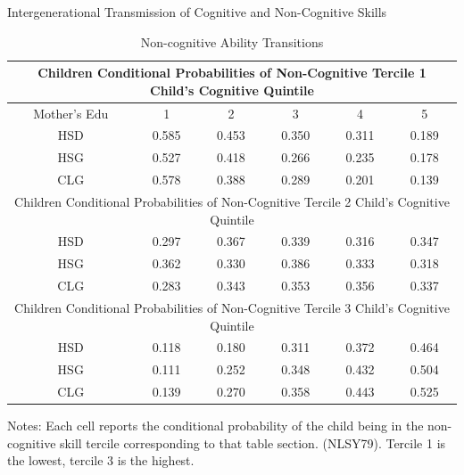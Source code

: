 \documentclass{beamer}
\begin{document}
\begin{frame}[label=Transmission1]{Intergenerational Transmission of Cognitive and Non-Cognitive Skills}
\hyperlink{Return5}{}

\begin {table}[H]
\caption {Non-cognitive Ability Transitions} \label{tab:title} 
\begin{center}
  \begin{tabular}{c | c  c  c  c  c}
      

\multicolumn{6}{c}{\tiny{Children Conditional Probabilities of Non-Cognitive Tercile 1 Child’s Cognitive Quintile}} \\

\hline
Mother’s Edu& 1& 2& 3& 4 & 5\\ \hline
HSD& 0.585 &0.453& 0.350 &0.311& 0.189\\
HSG& 0.527 &0.418 &0.266 &0.235& 0.178\\
CLG &0.578& 0.388& 0.289 &0.201& 0.139\\\hline

\multicolumn{6}{c}{\tiny{Children Conditional Probabilities of Non-Cognitive Tercile 2 Child’s Cognitive Quintile}}\\
HSD & 0.297 &0.367& 0.339 &0.316& 0.347\\
HSG & 0.362 &0.330 &0.386 &0.333 &0.318\\
CLG &0.283& 0.343 &0.353& 0.356& 0.337\\\hline

\multicolumn{6}{c}{\tiny{Children Conditional Probabilities of Non-Cognitive Tercile 3 Child’s Cognitive Quintile}}\\
HSD & 0.118 &0.180& 0.311 &0.372 &0.464\\
HSG &0.111 &0.252 &0.348 &0.432 &0.504\\
CLG &0.139& 0.270 &0.358 &0.443 &0.525\\\hline


\end{tabular}
\end{center}
\tiny{Notes: Each cell reports the conditional probability of the child being
in the non-cognitive skill tercile corresponding to that table section. (NLSY79). Tercile 1 is the lowest, tercile 3 is the highest.}

\end{table}

\end{frame}
\end{document}
